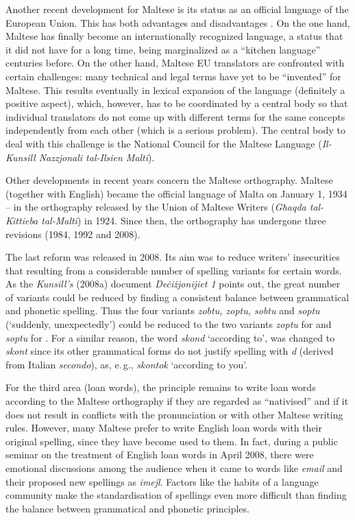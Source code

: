 \documentclass[]{../../metanetpaper}
\begin{document}
\begin{multicols}{2}
Another recent development for Maltese is its status as an official language of the European Union. This has both advantages and disadvantages \cite{Fabri:2011a}. On the one hand, Maltese has finally become an internationally recognized language, a status that it did not have for a long time, being marginalized as a ``kitchen language'' centuries before. On the other hand, Maltese EU translators are confronted with certain challenges: many technical and legal terms have yet to be ``invented'' for Maltese. This results eventually in lexical expansion of the language (definitely a positive aspect), which, however, has to be coordinated by a central body so that individual translators do not come up with different terms for the same concepts independently from each other (which is a serious problem). The central body to deal with this challenge is the National Council for the Maltese Language (\emph{Il-Kunsill Nazzjonali tal-Ilsien Malti}).

Other developments in recent years concern the Maltese orthography. Maltese (together with English) became the official language of Malta on January 1, 1934 – in the orthography released by the Union of Maltese Writers (\emph{Għaqda tal-Kittieba tal-Malti}) in 1924. Since then, the orthography has undergone three revisions (1984, 1992 and 2008).

The last reform was released in 2008. Its aim was to reduce writers' insecurities that resulting from a considerable number of spelling variants for certain words. As the \emph{Kunsill’s} (2008a) document \emph{Deċiżjonijiet 1} points out, the great number of variants could be reduced by finding a consistent balance between grammatical and phonetic spelling. Thus the four variants \emph{zobtu, zoptu, sobtu} and \emph{soptu} (`suddenly, unexpectedly') could be reduced to the two variants \emph{zoptu} for  and \emph{soptu} for . For a similar reason, the word \emph{skond}  `according to', was changed to \emph{skont} since its other grammatical forms do not justify spelling with \emph{d} (derived from Italian \emph{secondo}), as, e.\,g., \emph{skontok}  `according to you'.

For the third area (loan words), the principle remains to write loan words according to the Maltese orthography if they are regarded as ``nativised'' and if it does not result in conflicts with the pronunciation or with other Maltese writing rules. However, many Maltese prefer to write English loan words with their original spelling, since they have become used to them. In fact, during a public seminar on the treatment of English loan words in April 2008, there were emotional discussions among the audience when it came to words like \emph{email} and their proposed new spellings as \emph{imejl}. Factors like the habits of a language community make the standardisation of spellings even more difficult than finding the balance between grammatical and phonetic principles. 


\end{multicols}
\end{document}

